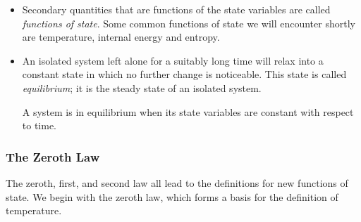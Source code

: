\documentclass[11pt, a4paper]{article}
\begin{document}
\begin{itemize}
	\item Secondary quantities that are functions of the state variables are called \textit{functions of state}. Some common functions of state we will encounter shortly are temperature, internal energy and entropy.
	
	\item An isolated system left alone for a suitably long time will relax into a constant state in which no further change is noticeable. This state is called \textit{equilibrium}; it is the steady state of an isolated system. 
	
	A system is in equilibrium when its state variables are constant with respect to time.
\end{itemize}

\subsubsection{The Zeroth Law}
The zeroth, first, and second law all lead to the definitions for new functions of state. We begin with the zeroth law, which forms a basis for the definition of temperature.
\end{document}

